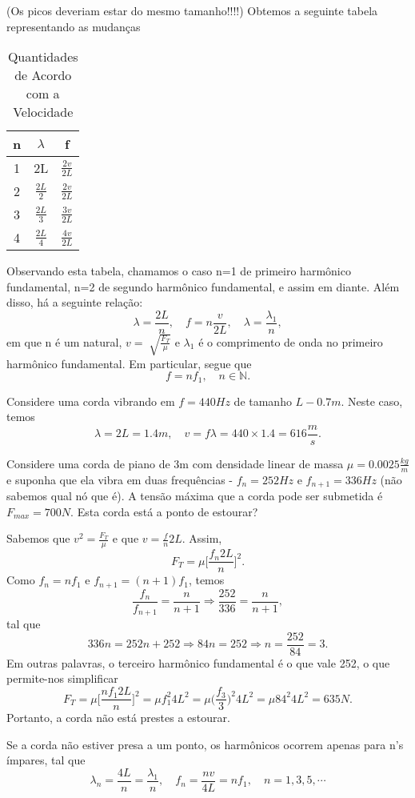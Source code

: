 \documentclass[physicsII_notes.tex]{subfiles}
\begin{document}
(Os picos deveriam estar do mesmo tamanho!!!!)
Obtemos a seguinte tabela representando as mudanças
\begin{center}
	\begin{table}[h!]
		\caption{Quantidades de Acordo com a Velocidade}
		\centering
		\begin{tabular}{| c | c | c |}
			\hline
			n & \(\lambda \)     & f                 \\
			\hline
			1 & 2L               & \(\frac{2v}{2L}\) \\
			2 & \(\frac{2L}{2}\) & \(\frac{2v}{2L}\) \\
			3 & \(\frac{2L}{3}\) & \(\frac{3v}{2L}\) \\
			4 & \(\frac{2L}{4}\) & \(\frac{4v}{2L}\) \\
			\hline
		\end{tabular}
	\end{table}
\end{center}
Observando esta tabela, chamamos o caso n=1 de primeiro harmônico fundamental, n=2 de segundo harmônico fundamental, e assim em diante. Além disso, há a seguinte relação:
\[
	\lambda = \frac{2L}{n},\quad f = n \frac{v}{2L},\quad \lambda = \frac{\lambda_{1}}{n},
\]
em que n é um natural, \(v = \sqrt[]{\frac{F_{T}}{\mu}}\) e \(\lambda_{1}\) é o comprimento de onda no primeiro harmônico fundamental. Em particular, segue que
\[
	f = n f_{1},\quad n\in \mathbb{N}.
\]
\begin{example}
	Considere uma corda vibrando em \(f = 440Hz\) de tamanho \(L - 0.7m\). Neste caso, temos
	\[
		\lambda  = 2L = 1.4m,\quad v = f\lambda = 440\times 1.4 = 616\frac{m}{s}.
	\]
\end{example}
\begin{example}
	Considere uma corda de piano de 3m com densidade linear de massa \(\mu = 0.0025 \frac{kg}{m}\) e suponha que ela vibra em duas frequências - \(f_{n} = 252Hz\) e \(f_{n+1} = 336Hz\)
	(não sabemos qual nó que é). A tensão máxima que a corda pode ser submetida é \(F_{max} = 700N.\) Esta corda está a ponto de estourar?

	Sabemos que \(v^{2} = \frac{F_{T}}{\mu}\) e que \(v = \frac{f}{n}2L\). Assim,
	\[
		F_{T} = \mu \biggl[\frac{f_{n}2L}{n}\biggr]^{2}.
	\]
	Como \(f_{n} = nf_{1}\) e \(f_{n+1} = (n+1)f_{1}\), temos
	\[
		\frac{f_{n}}{f_{n+1}} = \frac{n}{n+1} \Rightarrow \frac{252}{336} = \frac{n}{n+1},
	\]
	tal que
	\[
		336n = 252n + 252 \Rightarrow 84n = 252 \Rightarrow n = \frac{252}{84} = 3.
	\]
	Em outras palavras, o terceiro harmônico fundamental é o que vale 252, o que permite-nos simplificar
	\[
		F_{T} = \mu \biggl[\frac{nf_{1}2L}{n}\biggr]^{2} = \mu f_{1}^{2}4L^{2} = \mu \biggl(\frac{f_{3}}{3}\biggr)^{2}4L^{2} = \mu 84^{2}4L^{2} = 635N.
	\]
	Portanto, a corda não está prestes a estourar.
\end{example}
Se a corda não estiver presa a um ponto, os harmônicos ocorrem apenas para n's ímpares, tal que
\[
	\lambda_{n} = \frac{4L}{n} = \frac{\lambda_{1}}{n},\quad f_{n} = \frac{nv}{4L} = nf_{1},\quad n = 1, 3, 5, \cdots
\]
\end{document}
